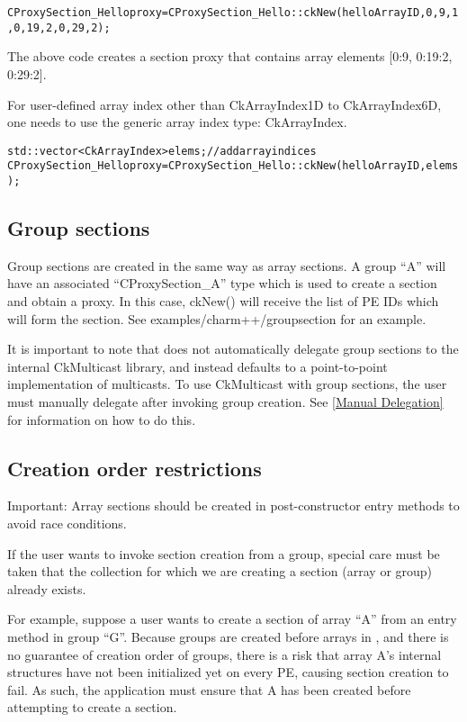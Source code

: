 \begin{alltt}
  CProxySection_Hello proxy = CProxySection_Hello::ckNew(helloArrayID, 0, 9, 1, 0, 19, 2, 0, 29, 2);
\end{alltt}

The above code creates a section proxy that contains array elements
[0:9, 0:19:2, 0:29:2].

For user-defined array index other than CkArrayIndex1D to CkArrayIndex6D,
one needs to use the generic array index type: CkArrayIndex.

\begin{alltt}
  std::vector<CkArrayIndex> elems;  // add array indices
  CProxySection_Hello proxy = CProxySection_Hello::ckNew(helloArrayID, elems);
\end{alltt}

\subsection{Group sections}

Group sections are created in the same way as array sections.
A group ``A'' will have an associated ``CProxySection\_A'' type which is used to create a section
and obtain a proxy.
In this case, ckNew() will receive the list of PE IDs which will form the section.
See examples/charm++/groupsection for an example.

It is important to note that \charmpp{} does not automatically delegate group sections to the
internal CkMulticast library,
and instead defaults to a point-to-point implementation of multicasts.
To use CkMulticast with group sections, the user must manually delegate after invoking group creation.
See \ref{Manual Delegation} for information on how to do this.

\subsection{Creation order restrictions}

Important: Array sections should be created in post-constructor entry methods to avoid race conditions.

If the user wants to invoke section creation from a group, special care must be taken
that the collection for which we are creating a section (array or group) already exists.

For example, suppose a user wants to create a section of array ``A'' from an entry
method in group ``G''. Because groups are created before arrays in \charmpp{}, and
there is no guarantee of creation order of groups, there is a risk that array A's
internal structures have not been initialized yet on every PE, causing section creation to fail.
As such, the application must ensure that A has been created
before attempting to create a section.


